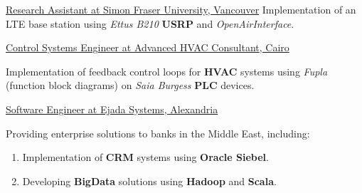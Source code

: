 \documentclass[letterpaper]{twentysecondcv} %
\begin{document}
\begin{twenty}
               {\underline{Research Assistant at \textcolor{OliveGreen}{Simon Fraser University}, Vancouver}}
               {}
               {Implementation of an LTE base station using \textit{Ettus B210} \textbf{USRP} and \textit{OpenAirInterface}.
               }

               {\underline{Control Systems Engineer at \textcolor{OliveGreen}{Advanced HVAC Consultant}, Cairo}}
               {}
               {Implementation of feedback control loops for \textbf{HVAC} systems using \textit{Fupla} (function block diagrams) on
                \textit{Saia Burgess} \textbf{PLC} devices.

               }

               {\underline{Software Engineer at \textcolor{OliveGreen}{Ejada Systems}, Alexandria}}
               {}
               {Providing enterprise solutions to banks in the Middle East, including:
                \begin{enumerate}
                    \item Implementation of \textbf{CRM} systems using \textbf{Oracle Siebel}.
                    \item Developing \textbf{BigData} solutions using
                          \textbf{Hadoop} and \textbf{Scala}.
                \end{enumerate}}


\end{twenty}
\end{document}
